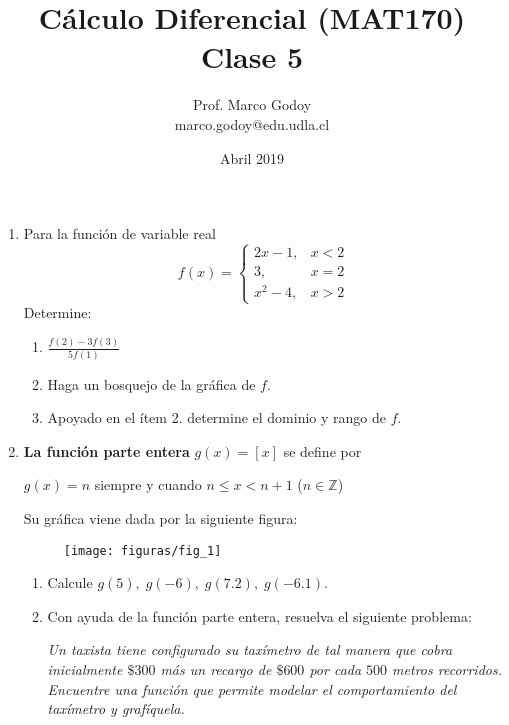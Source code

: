 \documentclass[10pt]{article}
\title{C\'alculo Diferencial (MAT170)\\ Clase 5 }
\author{Prof. Marco Godoy\\
marco.godoy@edu.udla.cl}
\date{Abril 2019}
\newcommand{\2}[1]{\hspace{-0.93cm}\colorbox{color1}{\hspace{0.07cm} \parbox{17cm}{\vspace{0.2cm} #1}\hspace*{0.07cm} }}
\newcommand{\3}[1]{\hspace{-0.93cm}\colorbox{color7}{\hspace{0.07cm} \parbox{17cm}{\vspace{0.2cm} #1}\hspace*{0.07cm} }}
\theoremstyle{theorem}
\numberwithin{equation}{section}
\newcommand{\dis}{\displaystyle}
\begin{document}
\maketitle

\begin{enumerate}[P1.]
    \item Para la funci\'on de variable real $$f(x)=\left\lbrace \begin{array}{lc}
    2x-1, &x<2 \\ 3,&x=2 \\x^2-4,&x>2
    \end{array}\right.$$
     Determine:
    \begin{enumerate}[1.]
    \item $\dis \frac{f(2)-3f(3)}{5f(1)}$
    \item Haga un bosquejo de la gr\'afica de $f$.
    \item Apoyado en el \'item 2. determine el dominio y rango de $f$.
    \end{enumerate}
    \item \textbf{La funci\'on parte entera} $g(x)=\left[x\right]$ se define por 
    \begin{center}
    $g(x)=n$ siempre y cuando $n\leq x <n+1$ ($n\in \mathbb{Z}$)
    \end{center}
    Su gr\'afica viene dada por la siguiente figura:
    \begin{figure}[h]
    \centering
    \texttt{[image: figuras/fig\_1]}
    \end{figure}
    \begin{enumerate}[1.]
    \item Calcule $g(5),\;g(-6),\; g(7.2),\; g(-6.1)$. 
    \item Con ayuda de la funci\'on parte entera, resuelva el siguiente problema:
    \begin{center}
    \textit{Un taxista tiene configurado su tax\'imetro de tal manera que cobra inicialmente $\$ 300$ m\'as un recargo de $\$ 600$ por cada $500$ metros recorridos. Encuentre una funci\'on que permite modelar el comportamiento del tax\'imetro y graf\'iquela.} 
    \end{center}
    \end{enumerate}
    \end{enumerate}
\end{document}
